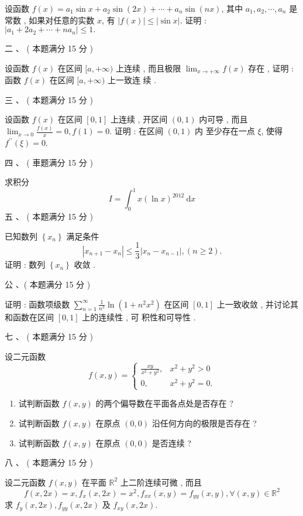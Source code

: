 \documentclass[10pt]{article}
\begin{document}
{ 设函数  $f(x)=a_{1} \sin x+a_{2} \sin (2 x)+\cdots+a_{n} \sin (n x)$,  其中  $a_{1}, a_{2}, \cdots, a_{n}$  是常数 ,  如果对任意的实数  $x$,  有  $|f(x)| \leqslant|\sin x|$.  证明 : $\left|a_{1}+2 a_{2}+\cdots+n a_{n}\right| \leqslant 1 .$

 二 、 ( 本题满分  15  分 )

 设函数  $f(x)$  在区间  $[a,+\infty)$  上连续 ,  而且极限  $\lim _{x \rightarrow+\infty} f(x)$  存在 ,  证明 :  函数  $f(x)$  在区间  $[a,+\infty)$  上一致连   续 .

 三 、 ( 本题满分  15  分 )

 设函数  $f(x)$  在区间  $[0,1]$  上连续 ,  开区间  $(0,1)$  内可导 ,  而且  $\lim _{x \rightarrow 0} \frac{f(x)}{x}=0, f(1)=0$.  证明 :  在区间  $(0,1)$  内   至少存在一点  $\xi$,  使得  $f^{\prime \prime}(\xi)=0$.

 四 、 ( 車题满分  15  分 )

 求积分 
$$
I=\int_{0}^{1} x(\ln x)^{2012} \mathrm{~d} x
$$
 五 、 ( 本题满分  15  分 )

 已知数列  $\left\{x_{n}\right\}$  满足条件 
$$
\left|x_{n+1}-x_{n}\right| \leqslant \frac{1}{3}\left|x_{n}-x_{n-1}\right|,(n \geqslant 2) .
$$
 证明 :  数列  $\left\{x_{n}\right\}$  收敛 .

 公 、( 本题满分  15  分 )

 证明 :  函数项级数  $\sum_{n=1}^{\infty} \frac{1}{n^{3}} \ln \left(1+n^{2} x^{2}\right)$  在区间  $[0,1]$  上一致收敛 ,  并讨论其和函数在区间  $[0,1]$  上的连续性 ,  可   积性和可导性 .

 七 、 ( 本题满分  15  分 )

 设二元函数 
$$
f(x, y)= \begin{cases}\frac{x y}{x^{2}+y^{2}}, & x^{2}+y^{2}>0 \\ 0, & x^{2}+y^{2}=0 .\end{cases}
$$

\begin{enumerate}
  \item  试判断函数  $f(x, y)$  的两个偏导数在平面各点处是否存在 ?

  \item  试判断函数  $f(x, y)$  在原点  $(0,0)$  沿任何方向的极限是否存在 ?

  \item  试判断函数  $f(x, y)$  在原点  $(0,0)$  是否连续 ?

\end{enumerate}
 八 、 ( 本题满分  15  分 )

 设二元函数  $f(x, y)$  在平面  $\mathbb{R}^{2}$  上二阶连续可微 ,  而且 
$$
f(x, 2 x)=x, f_{x}(x, 2 x)=x^{2}, f_{x x}(x, y)=f_{y y}(x, y), \forall(x, y) \in \mathbb{R}^{2}
$$
 求  $f_{y}(x, 2 x), f_{y y}(x, 2 x)$  及  $f_{x y}(x, 2 x)$.

}
\end{document}
